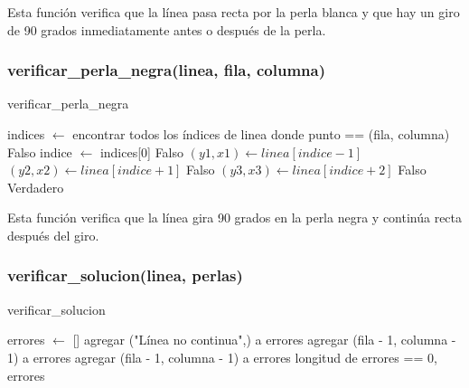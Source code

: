 \documentclass{article}
\begin{document}
Esta función verifica que la línea pasa recta por la perla blanca y que hay un giro de 90 grados inmediatamente antes o después de la perla.

\subsubsection{verificar\_perla\_negra(linea, fila, columna)}

\begin{algorithm}[H]
\caption{verificar\_perla\_negra}
\begin{algorithmic}[1]
    \State indices $\leftarrow$ encontrar todos los índices de linea donde punto == (fila, columna)
        \State \Return Falso
    \EndIf
    \State indice $\leftarrow$ indices[0]
        \State \Return Falso
    \EndIf
    \State $(y1, x1) \leftarrow linea[indice - 1]$
    \State $(y2, x2) \leftarrow linea[indice + 1]$
        \State \Return Falso
    \EndIf
        \State $(y3, x3) \leftarrow linea[indice + 2]$
            \State \Return Falso
        \EndIf
    \EndIf
    \State \Return Verdadero
\EndProcedure
\end{algorithmic}
\end{algorithm}

Esta función verifica que la línea gira 90 grados en la perla negra y continúa recta después del giro.

\subsubsection{verificar\_solucion(linea, perlas)}

\begin{algorithm}[H]
\caption{verificar\_solucion}
\begin{algorithmic}[1]
    \State errores $\leftarrow$ []
        \State agregar ("Línea no continua",) a errores
    \EndIf
                \State agregar (fila - 1, columna - 1) a errores
            \EndIf
        \EndIf
                \State agregar (fila - 1, columna - 1) a errores
            \EndIf
        \EndIf
    \EndFor
    \State \Return longitud de errores == 0, errores
\EndProcedure
\end{algorithmic}
\end{algorithm}
\end{document}
